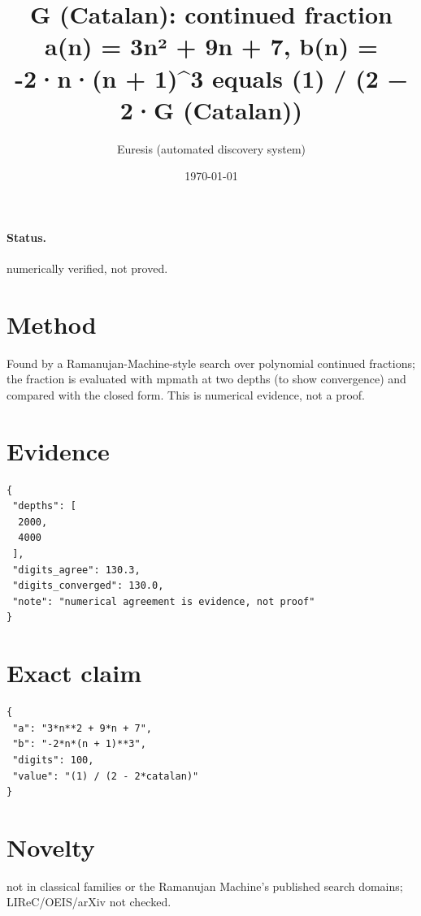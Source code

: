 \documentclass[11pt]{article}
\title{G (Catalan): continued fraction a(n) = 3n² + 9n + 7, b(n) = -2·n·(n + 1)\^{}3 equals (1) / (2 − 2·G (Catalan))}
\author{Euresis (automated discovery system)}
\date{\today}
\begin{document}
\maketitle
\paragraph{Status.} numerically verified, not proved.
\section{Method}
Found by a Ramanujan-Machine-style search over polynomial continued fractions; the fraction is evaluated with mpmath at two depths (to show convergence) and compared with the closed form. This is numerical evidence, not a proof.
\section{Evidence}
\begin{verbatim}
{
 "depths": [
  2000,
  4000
 ],
 "digits_agree": 130.3,
 "digits_converged": 130.0,
 "note": "numerical agreement is evidence, not proof"
}
\end{verbatim}
\section{Exact claim}
\begin{verbatim}
{
 "a": "3*n**2 + 9*n + 7",
 "b": "-2*n*(n + 1)**3",
 "digits": 100,
 "value": "(1) / (2 - 2*catalan)"
}
\end{verbatim}
\section{Novelty}
not in classical families or the Ramanujan Machine's published search domains; LIReC/OEIS/arXiv not checked.
\end{document}
